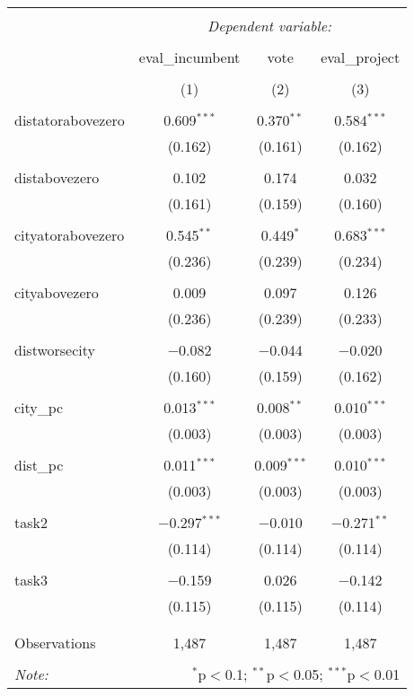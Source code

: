 \documentclass[12pt,letterpaper]{article}
\begin{document}
\begin{table}[h!] \centering 
	\caption{} 
	\label{} 
	\begin{tabular}{@{\extracolsep{5pt}}lccc} 
		\\[-1.8ex]\hline 
		\hline \\[-1.8ex] 
		& \multicolumn{3}{c}{\textit{Dependent variable:}} \\ 
		\cline{2-4} 
		\\[-1.8ex] & eval\_incumbent & vote & eval\_project \\ 
		\\[-1.8ex] & (1) & (2) & (3)\\ 
		\hline \\[-1.8ex] 
		distatorabovezero & 0.609$^{***}$ & 0.370$^{**}$ & 0.584$^{***}$ \\ 
		& (0.162) & (0.161) & (0.162) \\ 
		& & & \\ 
		distabovezero & 0.102 & 0.174 & 0.032 \\ 
		& (0.161) & (0.159) & (0.160) \\ 
		& & & \\ 
		cityatorabovezero & 0.545$^{**}$ & 0.449$^{*}$ & 0.683$^{***}$ \\ 
		& (0.236) & (0.239) & (0.234) \\ 
		& & & \\ 
		cityabovezero & 0.009 & 0.097 & 0.126 \\ 
		& (0.236) & (0.239) & (0.233) \\ 
		& & & \\ 
		distworsecity & $-$0.082 & $-$0.044 & $-$0.020 \\ 
		& (0.160) & (0.159) & (0.162) \\ 
		& & & \\ 
		city\_pc & 0.013$^{***}$ & 0.008$^{**}$ & 0.010$^{***}$ \\ 
		& (0.003) & (0.003) & (0.003) \\ 
		& & & \\ 
		dist\_pc & 0.011$^{***}$ & 0.009$^{***}$ & 0.010$^{***}$ \\ 
		& (0.003) & (0.003) & (0.003) \\ 
		& & & \\ 
		task2 & $-$0.297$^{***}$ & $-$0.010 & $-$0.271$^{**}$ \\ 
		& (0.114) & (0.114) & (0.114) \\ 
		& & & \\ 
		task3 & $-$0.159 & 0.026 & $-$0.142 \\ 
		& (0.115) & (0.115) & (0.114) \\ 
		& & & \\ 
		\hline \\[-1.8ex] 
		Observations & 1,487 & 1,487 & 1,487 \\ 
		\hline 
		\hline \\[-1.8ex] 
		\textit{Note:}  & \multicolumn{3}{r}{$^{*}$p$<$0.1; $^{**}$p$<$0.05; $^{***}$p$<$0.01} \\ 
	\end{tabular} 
\end{table} 
\end{document}

